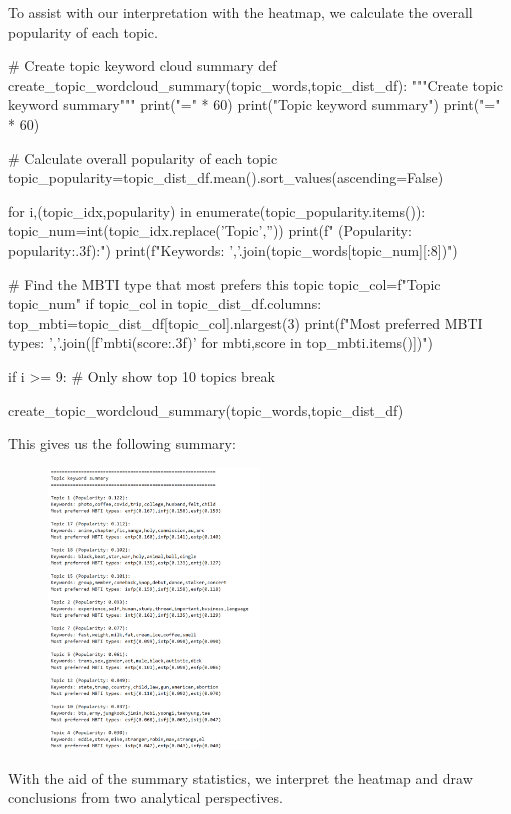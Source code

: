 \documentclass[12pt]{article}
\begin{document}
	To assist with our interpretation with the heatmap, we calculate the overall popularity of each topic.
	\begin{python}
# Create topic keyword cloud summary
def create_topic_wordcloud_summary(topic_words,topic_dist_df):
    """Create topic keyword summary"""
    print("=" * 60)
    print("Topic keyword summary")
    print("=" * 60)
    
    # Calculate overall popularity of each topic
    topic_popularity=topic_dist_df.mean().sort_values(ascending=False)
    
    for i,(topic_idx,popularity) in enumerate(topic_popularity.items()):
        topic_num=int(topic_idx.replace('Topic',''))
        print(f" (Popularity: {popularity:.3f}):")
        print(f"Keywords: {','.join(topic_words[topic_num][:8])}")
        
        # Find the MBTI type that most prefers this topic
        topic_col=f"Topic {topic_num}"
        if topic_col in topic_dist_df.columns:
            top_mbti=topic_dist_df[topic_col].nlargest(3)
            print(f"Most preferred MBTI types: {','.join([f'{mbti}({score:.3f})' for mbti,score in top_mbti.items()])}")
        
        if i >= 9:  # Only show top 10 topics
            break


create_topic_wordcloud_summary(topic_words,topic_dist_df)
	\end{python}
	 This gives us the following summary:
	 \begin{figure}[H]
	 		\centering
	 		\includegraphics[width=0.5\textwidth]{Q2topsum} 	
	 \end{figure}
	 
	 With the aid of the summary statistics, we interpret the heatmap and draw conclusions from two analytical perspectives.
	 
\end{document}
